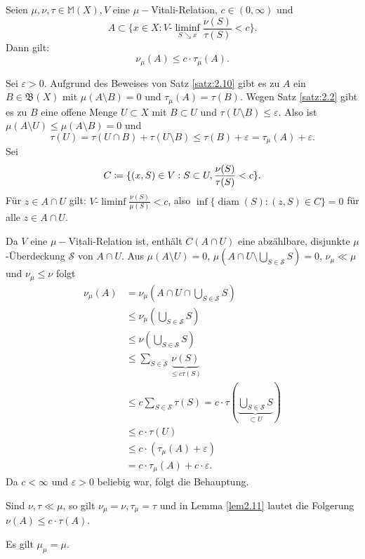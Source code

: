 \documentclass[a4paper,twoside,DIV15,BCOR12mm]{scrbook}
\newcommand{\borel}{\mathfrak B}
\DeclareMathOperator{\diam}{diam}
\newcommand{\downto}{\mathrel\searrow}
\begin{document}
\begin{lemma}
\label{lem2.11}
Seien \(\mu, \nu, \tau \in \mathbb{M}(X), V\) eine \(\mu-\)Vitali-Relation, \(c \in (0,\infty)\) und \[A \subset \{ x \in X : V\text{-}\liminf_{S\downto x} \frac{\nu(S)}{\tau(S)} < c \}.\]
Dann gilt: 
$$
\nu_\mu(A) \leq c \cdot \tau_\mu(A).
$$
\end{lemma}

\begin{beweis}
Sei \(\varepsilon > 0\). Aufgrund des Beweises von Satz \ref{satz:2.10} gibt es zu $A$ ein \(B \in \borel(X)\) mit \(\mu(A \setminus B)=0\) und \(\tau_\mu(A) = \tau(B)\).
Wegen Satz \ref{satz:2.2} gibt es zu $B$ eine offene Menge \(U \subset X\) mit \(B \subset U\) und \(\tau(U \setminus B) \leq \varepsilon\). Also ist \(\mu(A \setminus U) \leq \mu(A \setminus B)=0\) und
\[
\tau(U) = \tau(U \cap B) + \tau(U \setminus B) \leq \tau(B) + \varepsilon = \tau_\mu(A) + \varepsilon.
\]
Sei 
$$
C \da \{ (x,S) \in V : S \subset U , \frac{\nu(S)}{\tau(S)} < c \}.
$$ 
Für \(z\in A\cap U\) gilt: \(V\text{-}\liminf\frac{\nu(S)}{\mu(S)} < c\), also \(\inf\{\diam(S):(z,S)\in C\}=0\) für alle \(z \in A \cap U\). 

Da \(V\) eine \(\mu-\)Vitali-Relation ist, enthält \(C(A\cap U)\) eine abzählbare, disjunkte \(\mu\)-Überdeckung \(\mathcal{S}\) von \(A\cap U\). Aus \(\mu(A \setminus U)=0\), \(\mu(A\cap U \setminus \bigcup_{S\in \mathcal{S}} S) = 0\), \(\nu_\mu \ll \mu\) und \(\nu_\mu \leq \nu\) folgt
\begin{align*}
\nu_\mu(A) &= \nu_\mu(A\cap U \cap \bigcup_{S\in\mathcal{S}}S) \\
&\leq \nu_\mu(\bigcup_{S\in\mathcal{S}} S) \\
&\leq \nu(\bigcup_{S\in\mathcal{S}} S) \\
&\leq \sum_{S\in\mathcal{S}}\underbrace{\nu(S)}_{\leq c\tau(S)}\\
&\leq c\sum_{S\in\mathcal{S}} \tau(S) = c\cdot \tau(\underbrace{\bigcup_{S\in\mathcal{S}}S}_{\subset U})\\
&\leq c\cdot\tau(U) \\
&\leq c\cdot(\tau_\mu(A)+\varepsilon) \\
&= c\cdot\tau_\mu(A)+c\cdot\varepsilon.
\end{align*}
Da \(c<\infty\) und \(\varepsilon>0\) beliebig war, folgt die Behauptung.
\end{beweis}

\begin{bemerkungen}
	\item Sind \(\nu,\tau \ll \mu\), so gilt \(\nu_\mu=\nu, \tau_\mu=\tau\) und in Lemma \ref{lem2.11} lautet die Folgerung \(\nu(A) \leq c\cdot\tau(A)\).
	\item Es gilt \(\mu_\mu=\mu\).
\end{bemerkungen}
\end{document}
